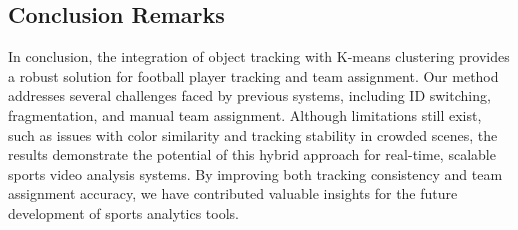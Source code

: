 \subsection{Conclusion Remarks}

In conclusion, the integration of object tracking with K-means clustering provides a robust solution for football player tracking and team assignment. Our method addresses several challenges faced by previous systems, including ID switching, fragmentation, and manual team assignment. Although limitations still exist, such as issues with color similarity and tracking stability in crowded scenes, the results demonstrate the potential of this hybrid approach for real-time, scalable sports video analysis systems. By improving both tracking consistency and team assignment accuracy, we have contributed valuable insights for the future development of sports analytics tools.
